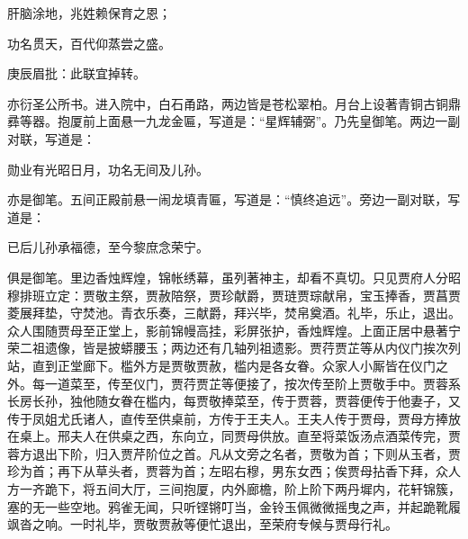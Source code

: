 \begin{poem}
    \begin{pl}肝脑涂地，兆姓赖保育之恩；
    \end{pl}
    \begin{pl}功名贯天，百代仰蒸尝之盛。\end{pl}
    \begin{note}庚辰眉批：此联宜掉转。\end{note}
\end{poem}
\begin{parag}

    亦衍圣公所书。进入院中，白石甬路，两边皆是苍松翠柏。月台上设著青铜古铜鼎彞等器。抱厦前上面悬一九龙金匾，写道是：“星辉辅弼”。乃先皇御笔。两边一副对联，写道是：
\end{parag}
\begin{poem}

    \begin{pl}

        勋业有光昭日月，功名无间及儿孙。
    \end{pl}

\end{poem}
\begin{parag}

    亦是御笔。五间正殿前悬一闹龙填青匾，写道是：“慎终追远”。旁边一副对联，写道是：
\end{parag}

\begin{poem}
    \begin{pl}

        已后儿孙承福德，至今黎庶念荣宁。
    \end{pl}

\end{poem}
\begin{parag}

    俱是御笔。里边香烛辉煌，锦帐绣幕，虽列著神主，却看不真切。只见贾府人分昭穆排班立定：贾敬主祭，贾赦陪祭，贾珍献爵，贾琏贾琮献帛，宝玉捧香，贾菖贾菱展拜垫，守焚池。青衣乐奏，三献爵，拜兴毕，焚帛奠酒。礼毕，乐止，退出。众人围随贾母至正堂上，影前锦幔高挂，彩屏张护，香烛辉煌。上面正居中悬著宁荣二祖遗像，皆是披蟒腰玉；两边还有几轴列祖遗影。贾荇贾芷等从内仪门挨次列站，直到正堂廊下。槛外方是贾敬贾赦，槛内是各女眷。众家人小厮皆在仪门之外。每一道菜至，传至仪门，贾荇贾芷等便接了，按次传至阶上贾敬手中。贾蓉系长房长孙，独他随女眷在槛内，每贾敬捧菜至，传于贾蓉，贾蓉便传于他妻子，又传于凤姐尤氏诸人，直传至供桌前，方传于王夫人。王夫人传于贾母，贾母方捧放在桌上。邢夫人在供桌之西，东向立，同贾母供放。直至将菜饭汤点酒菜传完，贾蓉方退出下阶，归入贾芹阶位之首。凡从文旁之名者，贾敬为首；下则从玉者，贾珍为首；再下从草头者，贾蓉为首；左昭右穆，男东女西；俟贾母拈香下拜，众人方一齐跪下，将五间大厅，三间抱厦，内外廊檐，阶上阶下两丹墀内，花轩锦簇，塞的无一些空地。鸦雀无闻，只听铿锵叮当，金铃玉佩微微摇曳之声，并起跪靴履飒沓之响。一时礼毕，贾敬贾赦等便忙退出，至荣府专候与贾母行礼。
\end{parag}


